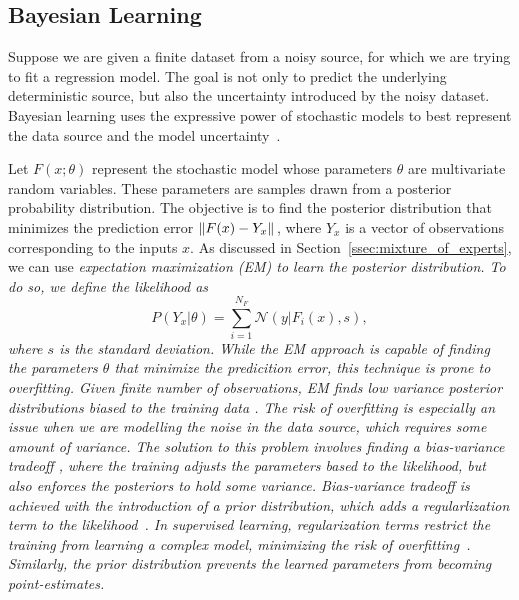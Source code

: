 \subsection{Bayesian Learning}
\label{ssec:bayesianLearning}

Suppose we are given a finite dataset from a noisy source, for which we are trying to fit a regression model.
%
The goal is not only to predict the underlying deterministic source, but also the uncertainty introduced by the noisy dataset.
%
Bayesian learning uses the expressive power of stochastic models to best represent the data source and the model uncertainty~\cite{bishop2006pattern}.


Let $F(x; \theta)$ represent the stochastic model whose parameters $\theta$ are multivariate random variables.
%
These parameters are samples drawn from a posterior probability distribution.
%
The objective is to find the posterior distribution that minimizes the prediction error $\|{F(x) -  Y_x}\|_{{}_{}}$, where $Y_x$ is a vector of observations corresponding to the inputs $x$.
%
As discussed in Section~\ref{ssec:mixture_of_experts}, we can use \it{expectation maximization} \normalfont (EM) to learn the posterior distribution.
%
To do so, we define the likelihood as 
\begin{equation*}
  P(Y_x | \theta)  =  \sum_{i=1}^{N_F} \mathcal{N}(y | F_i(x), s),
\end{equation*}
\noindent where $s$ is the standard deviation.
%
While the EM approach is capable of finding the parameters $\theta$ that minimize the predicition error, this technique is prone to overfitting.
%
Given finite number of observations, EM finds low variance posterior distributions \it{biased to the training data} \normalfont.
The risk of overfitting is especially an issue when we are modelling the noise in the data source, which requires some amount of variance.
%
The solution to this problem involves finding a \it{bias-variance tradeoff} \normalfont, where the training adjusts the parameters based to the likelihood, but 
also enforces the posteriors to hold some variance.
%
Bias-variance tradeoff is achieved with the introduction of a prior distribution, which adds a regularlization term to the likelihood~\cite{bishop2006pattern}.
%
In supervised learning, regularization terms restrict the training from learning a complex model, minimizing the risk of overfitting~\cite{santos2022avoiding}.
%
Similarly, the prior distribution prevents the learned parameters from becoming point-estimates.
%


